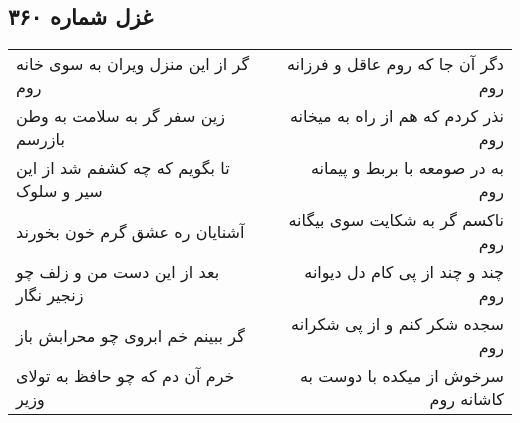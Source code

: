 \begin{center}
\section*{غزل شماره ۳۶۰}
\label{sec:sh360}
\begin{longtable}{l p{0.5cm} r}
گر از این منزل ویران به سوی خانه روم
&&
دگر آن جا که روم عاقل و فرزانه روم
\\
زین سفر گر به سلامت به وطن بازرسم
&&
نذر کردم که هم از راه به میخانه روم
\\
تا بگویم که چه کشفم شد از این سیر و سلوک
&&
به در صومعه با بربط و پیمانه روم
\\
آشنایان ره عشق گرم خون بخورند
&&
ناکسم گر به شکایت سوی بیگانه روم
\\
بعد از این دست من و زلف چو زنجیر نگار
&&
چند و چند از پی کام دل دیوانه روم
\\
گر ببینم خم ابروی چو محرابش باز
&&
سجده شکر کنم و از پی شکرانه روم
\\
خرم آن دم که چو حافظ به تولای وزیر
&&
سرخوش از میکده با دوست به کاشانه روم
\\
\end{longtable}
\end{center}
